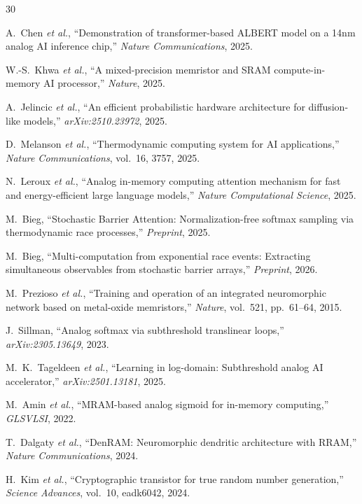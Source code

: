 \documentclass[11pt]{article}
\begin{document}
\begin{thebibliography}{30}

 A.~Chen \textit{et al.}, ``Demonstration of transformer-based ALBERT model on a 14nm analog AI inference chip,'' \textit{Nature Communications}, 2025.

 W.-S.~Khwa \textit{et al.}, ``A mixed-precision memristor and SRAM compute-in-memory AI processor,'' \textit{Nature}, 2025.

 A.~Jelincic \textit{et al.}, ``An efficient probabilistic hardware architecture for diffusion-like models,'' \textit{arXiv:2510.23972}, 2025.

 D.~Melanson \textit{et al.}, ``Thermodynamic computing system for AI applications,'' \textit{Nature Communications}, vol.~16, 3757, 2025.

 N.~Leroux \textit{et al.}, ``Analog in-memory computing attention mechanism for fast and energy-efficient large language models,'' \textit{Nature Computational Science}, 2025.

 M.~Bieg, ``Stochastic Barrier Attention: Normalization-free softmax sampling via thermodynamic race processes,'' \textit{Preprint}, 2025.

 M.~Bieg, ``Multi-computation from exponential race events: Extracting simultaneous observables from stochastic barrier arrays,'' \textit{Preprint}, 2026.

 M.~Prezioso \textit{et al.}, ``Training and operation of an integrated neuromorphic network based on metal-oxide memristors,'' \textit{Nature}, vol.~521, pp.~61--64, 2015.

 J.~Sillman, ``Analog softmax via subthreshold translinear loops,'' \textit{arXiv:2305.13649}, 2023.

 M.~K.~Tageldeen \textit{et al.}, ``Learning in log-domain: Subthreshold analog AI accelerator,'' \textit{arXiv:2501.13181}, 2025.

 M.~Amin \textit{et al.}, ``MRAM-based analog sigmoid for in-memory computing,'' \textit{GLSVLSI}, 2022.

 T.~Dalgaty \textit{et al.}, ``DenRAM: Neuromorphic dendritic architecture with RRAM,'' \textit{Nature Communications}, 2024.

 H.~Kim \textit{et al.}, ``Cryptographic transistor for true random number generation,'' \textit{Science Advances}, vol.~10, eadk6042, 2024.


\end{thebibliography}
\end{document}
